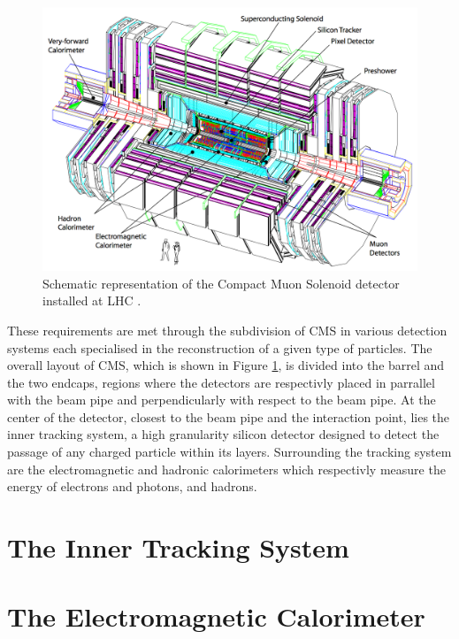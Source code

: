     \begin{figure}[h!]
      \centering
      \includegraphics[width=\textwidth]{img/I-3-cms/cms.png}
      \caption{Schematic representation of the Compact Muon Solenoid detector installed at LHC \cite{1748-0221-3-08-S08004}.}
      \label{fig:I-3-cms-global-view}
    \end{figure}

    These requirements are met through the subdivision of CMS in various detection systems each specialised in the reconstruction of a given type of particles. The overall layout of CMS, which is shown in Figure \ref{fig:I-3-cms-global-view}, is divided into the barrel and the two endcaps, regions where the detectors are respectivly placed in parrallel with the beam pipe and perpendicularly with respect to the beam pipe. At the center of the detector, closest to the beam pipe and the interaction point, lies the inner tracking system, a high granularity silicon detector designed to detect the passage of any charged particle within its layers. Surrounding the tracking system are the electromagnetic and hadronic calorimeters which respectivly measure the energy of electrons and photons, and hadrons.


  \section{The Inner Tracking System}

  \section{The Electromagnetic Calorimeter}

